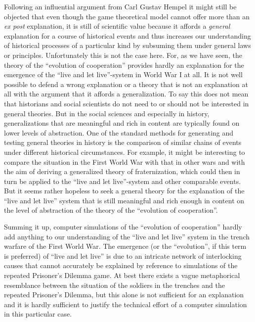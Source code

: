 Following an influential argument from Carl Gustav Hempel \cite[]{hempel:1965}
it might still be objected that even though the game theoretical model cannot
offer more than an {\em ex post} explanation, it is still of scientific value
because it affords a {\em general} explanation for a course of historical
events and thus increases our understanding of historical processes of a
particular kind by subsuming them under general laws or principles.
Unfortunately this is not the case here. For, as we have seen, the theory of
the ``evolution of cooperation'' provides hardly an explanation for the
emergence of the ``live and let live''-system in World War I at all. It is not
well possible to defend a wrong explanation or a theory that is not an
explanation at all with the argument that it affords a generalization. To say
this does not mean that historians and social scientists do not need to or
should not be interested in general theories.  But in the social sciences and
especially in history, generalizations that are meaningful and rich in content
are typically found on lower levels of abstraction. One of the standard
methods for generating and testing general theories in history is the
comparison of similar chains of events under different historical
circumstances. For example, it might be interesting to compare the situation
in the First World War with that in other wars and with the aim of deriving a
generalized theory of fraternization, which could then in turn be applied to
the ``live and let live''-system and other comparable events.  But it seems
rather hopeless to seek a general theory for the explanation of the ``live and
let live'' system that is still meaningful and rich enough in content on the
level of abstraction of the theory of the ``evolution of cooperation''.

Summing it up, computer simulations of the ``evolution of cooperation'' hardly
add anything to our understanding of the ``live and let live'' system in the
trench warfare of the First World War. The emergence (or the ``evolution'', if
this term is preferred) of ``live and let live'' is due to an intricate
network of interlocking causes that cannot accurately be explained by
reference to simulations of the repeated Prisoner's Dilemma game. At best
there exists a vague metaphorical resemblance between the situation of the
soldiers in the trenches and the repeated Prisoner's Dilemma, but this alone
is not sufficient for an explanation and it is hardly sufficient to justify
the technical effort of a computer simulation in this particular case.

